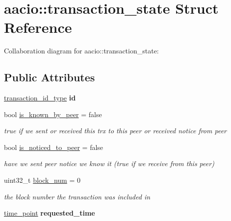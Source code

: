 \hypertarget{structaacio_1_1transaction__state}{}\section{aacio\+:\+:transaction\+\_\+state Struct Reference}
\label{structaacio_1_1transaction__state}


Collaboration diagram for aacio\+:\+:transaction\+\_\+state\+:
\subsection*{Public Attributes}
\begin{DoxyCompactItemize}
\item 
\mbox{\label{structaacio_1_1transaction__state_ab1f0e595bc135458667c9fc12d9f4f59}} 
\mbox{\hyperlink{classfc_1_1sha256}{transaction\+\_\+id\+\_\+type}} {\bfseries id}
\item 
\mbox{\label{structaacio_1_1transaction__state_a495df89bd4743f1d40d9fa47fd813d28}} 
bool \mbox{\hyperlink{structaacio_1_1transaction__state_a495df89bd4743f1d40d9fa47fd813d28}{is\+\_\+known\+\_\+by\+\_\+peer}} = false
\begin{DoxyCompactList}\small\item\em true if we sent or received this trx to this peer or received notice from peer \end{DoxyCompactList}\item 
\mbox{\label{structaacio_1_1transaction__state_ad2d3c972d5bb716c649aa7d1d29f51ff}} 
bool \mbox{\hyperlink{structaacio_1_1transaction__state_ad2d3c972d5bb716c649aa7d1d29f51ff}{is\+\_\+noticed\+\_\+to\+\_\+peer}} = false
\begin{DoxyCompactList}\small\item\em have we sent peer notice we know it (true if we receive from this peer) \end{DoxyCompactList}\item 
\mbox{\label{structaacio_1_1transaction__state_a54bc02434925275f0bb541fcebdc83fe}} 
uint32\+\_\+t \mbox{\hyperlink{structaacio_1_1transaction__state_a54bc02434925275f0bb541fcebdc83fe}{block\+\_\+num}} = 0
\begin{DoxyCompactList}\small\item\em the block number the transaction was included in \end{DoxyCompactList}\item 
\mbox{\label{structaacio_1_1transaction__state_ad9fc1f3156d16ac872d4638b9e79206f}} 
\mbox{\hyperlink{classfc_1_1time__point}{time\+\_\+point}} {\bfseries requested\+\_\+time}
\end{DoxyCompactItemize}


